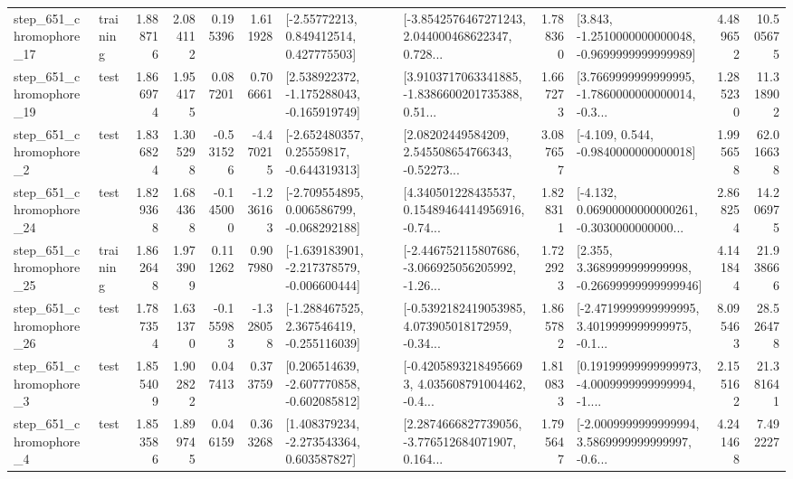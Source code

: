 \begin{tabular}{llrrrrllrlrr}
  step\_651\_chromophore\_17 &  training &      1.888716 &    2.084112 &      0.195396 &  1.611928 &     [-2.55772213, 0.849412514, 0.427775503] &  [-3.8542576467271243, 2.044000468622347, 0.728... &       1.788360 &  [3.843, -1.2510000000000048, -0.9699999999999989] &            4.489652 &         10.505675 \\
  step\_651\_chromophore\_19 &      test &      1.866974 &    1.954175 &      0.087201 &  0.706661 &   [2.538922372, -1.175288043, -0.165919749] &  [3.9103717063341885, -1.8386600201735388, 0.51... &       1.667273 &  [3.7669999999999995, -1.7860000000000014, -0.3... &            1.285230 &         11.318902 \\
   step\_651\_chromophore\_2 &      test &      1.836824 &    1.305298 &     -0.531526 & -4.470215 &    [-2.652480357, 0.25559817, -0.644319313] &  [2.08202449584209, 2.545508654766343, -0.52273... &       3.087657 &               [-4.109, 0.544, -0.9840000000000018] &            1.995658 &         62.016638 \\
  step\_651\_chromophore\_24 &      test &      1.829368 &    1.684368 &     -0.145000 & -1.236163 &   [-2.709554895, 0.006586799, -0.068292188] &  [4.340501228435537, 0.15489464414956916, -0.74... &       1.828311 &  [-4.132, 0.06900000000000261, -0.3030000000000... &            2.868254 &         14.206975 \\
  step\_651\_chromophore\_25 &  training &      1.862648 &    1.973909 &      0.111262 &  0.907980 &  [-1.639183901, -2.217378579, -0.006600444] &  [-2.446752115807686, -3.066925056205992, -1.26... &       1.722923 &  [2.355, 3.3689999999999998, -0.26699999999999946] &            4.141844 &         21.938666 \\
  step\_651\_chromophore\_26 &      test &      1.787354 &    1.631370 &     -0.155983 & -1.328058 &   [-1.288467525, 2.367546419, -0.255116039] &  [-0.5392182419053985, 4.073905018172959, -0.34... &       1.865782 &  [-2.4719999999999995, 3.4019999999999975, -0.1... &            8.095463 &         28.526478 \\
   step\_651\_chromophore\_3 &      test &      1.855409 &    1.902822 &      0.047413 &  0.373759 &   [0.206514639, -2.607770858, -0.602085812] &  [-0.42058932184956693, 4.035608791004462, -0.4... &       1.810833 &  [0.19199999999999973, -4.0009999999999994, -1.... &            2.155162 &         21.381641 \\
   step\_651\_chromophore\_4 &      test &      1.853586 &    1.899745 &      0.046159 &  0.363268 &    [1.408379234, -2.273543364, 0.603587827] &  [2.2874666827739056, -3.776512684071907, 0.164... &       1.795647 &  [-2.0009999999999994, 3.5869999999999997, -0.6... &            4.241468 &          7.492227 \\

\end{tabular}
